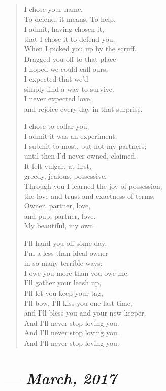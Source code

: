 \begin{verse}
  I chose your name.\\
  To defend, it means. To help.\\
  I admit, having chosen it,\\
  that I chose it to defend you.\\
  When I picked you up by the scruff,\\
  Dragged you off to that place\\
  I hoped we could call ours,\\
  I expected that we'd\\
  simply find a way to survive.\\
  I never expected love,\\
  and rejoice every day in that surprise.

  I chose to collar you.\\
  I admit it was an experiment,\\
  I submit to most, but not my partners;\\
  until then I'd never owned, claimed.\\
  It felt vulgar, at first,\\
  greedy, jealous, possessive.\\
  Through you I learned the joy of possession,\\
  the love and trust and exactness of terms.\\
  Owner, partner, love,\\
  and pup, partner, love.\\
  My beautiful, my own.

  I'll hand you off some day.\\
  I'm a less than ideal owner\\
  in so many terrible ways:\\
  I owe you more than you owe me.\\
  I'll gather your leash up,\\
  I'll let you keep your tag,\\
  I'll bow, I'll kiss you one last time,\\
  and I'll bless you and your new keeper.\\
  And I'll never stop loving you.\\
  And I'll never stop loving you.\\
  And I'll never stop loving you.
\end{verse}
\newpage

\section{--- \textit{March, 2017}}

